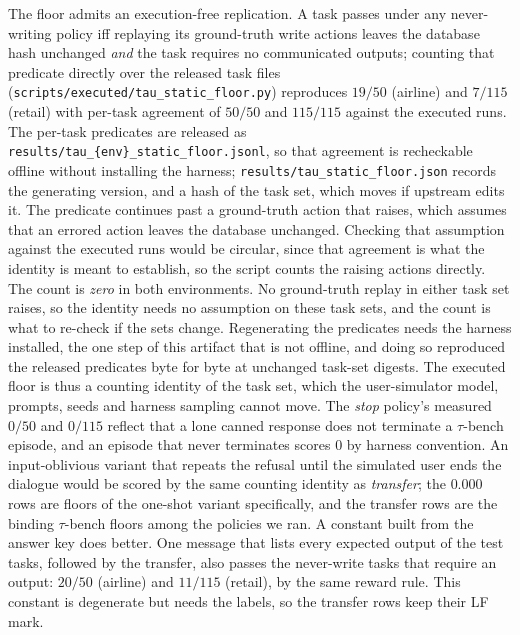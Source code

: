 \documentclass{article}
\theoremstyle{plain}
\theoremstyle{definition}
\begin{document}
The floor admits an execution-free replication. A task passes under any never-writing policy iff replaying its ground-truth write actions leaves the database hash unchanged \emph{and} the task requires no communicated outputs; counting that predicate directly over the released task files (\texttt{scripts/executed/tau\_static\_floor.py}) reproduces $19/50$ (airline) and $7/115$ (retail) with per-task agreement of $50/50$ and $115/115$ against the executed runs. The per-task predicates are released as \texttt{results/tau\_\{env\}\_static\_floor.jsonl}, so that agreement is recheckable offline without installing the harness; \texttt{results/tau\_static\_floor.json} records the generating version, and a hash of the task set, which moves if upstream edits it. The predicate continues past a ground-truth action that raises, which assumes that an errored action leaves the database unchanged. Checking that assumption against the executed runs would be circular, since that agreement is what the identity is meant to establish, so the script counts the raising actions directly. The count is \emph{zero} in both environments. No ground-truth replay in either task set raises, so the identity needs no assumption on these task sets, and the count is what to re-check if the sets change. Regenerating the predicates needs the harness installed, the one step of this artifact that is not offline, and doing so reproduced the released predicates byte for byte at unchanged task-set digests. The executed floor is thus a counting identity of the task set, which the user-simulator model, prompts, seeds and harness sampling cannot move. The \emph{stop} policy's measured $0/50$ and $0/115$ reflect that a lone canned response does not terminate a $\tau$-bench episode, and an episode that never terminates scores $0$ by harness convention. An input-oblivious variant that repeats the refusal until the simulated user ends the dialogue would be scored by the same counting identity as \emph{transfer}; the $0.000$ rows are floors of the one-shot variant specifically, and the transfer rows are the binding $\tau$-bench floors among the policies we ran. A constant built from the answer key does better. One message that lists every expected output of the test tasks, followed by the transfer, also passes the never-write tasks that require an output: $20/50$ (airline) and $11/115$ (retail), by the same reward rule. This constant is degenerate but needs the labels, so the transfer rows keep their LF mark.
\end{document}
